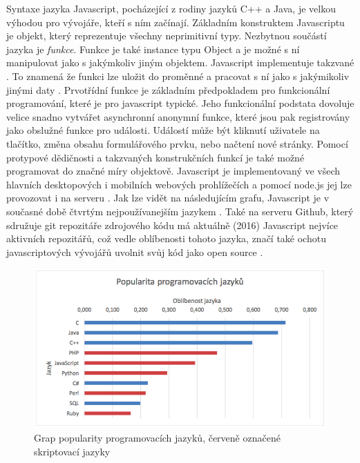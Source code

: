 \FloatBarrier
Syntaxe jazyka Javascript, pocházející z rodiny jazyků C++ a Java, je velkou výhodou pro vývojáře, kteří s ním začínají. Základním konstruktem Javascriptu je objekt, který reprezentuje všechny neprimitivní typy. Nezbytnou součástí jazyka je \textit{funkce}. Funkce je také instance typu Object a je možné s ní manipulovat jako s jakýmkoliv jiným objektem. Javascript implementuje takzvané . To znamená že funkci lze uložit do proměnné a pracovat s ní jako s jakýmikoliv jinými daty \cite{flanagan_javascript}. Prvotřídní funkce je základním předpokladem pro funkcionální programování, které je pro javascript typické. Jeho funkcionální podstata dovoluje velice snadno vytvářet asynchronní anonymní funkce, které jsou pak registrovány jako obslužné funkce pro události. Událostí může být kliknutí uživatele na tlačítko, změna obsahu formulářového prvku, nebo načtení nové stránky. Pomocí protypové dědičnosti a takzvaných konstrukčních funkcí je také možné programovat do značné míry objektově. Javascript je implementovaný ve všech hlavních desktopových i mobilních webových prohlížečích a pomocí node.js jej lze provozovat i na serveru \cite{flanagan_javascript} \cite{hronek_javascript}. Jak lze vidět na následujícím grafu, Javascript je v současné době čtvrtým nejpoužívanejším jazykem \cite{skriptovaci_jazyky}. Také na serveru Github, který sdružuje git repozitáře zdrojového kódu má aktuálně (2016) Javascript nejvíce aktivních repozitářů, což vedle oblíbenosti tohoto jazyka, značí také ochotu javascriptových vývojářů uvolnit svůj kód jako open source \cite{githut}.
\vspace{0,3cm}
\begin{figure}[h]
\begin{centering}
\includegraphics[scale=0.5]{obrazky/popularita_jazyku}
\par\end{centering}
\caption{Grap popularity programovacích jazyků, červeně označené skriptovací jazyky \cite{skriptovaci_jazyky} \label{fig:language-preferences}}
\end{figure}

